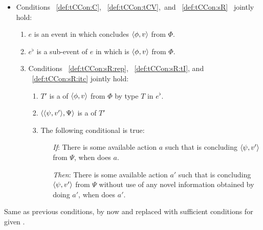 \begin{note}
\begin{definition}
    \begin{itemize}
    \item
      Conditions~%
      \ref{def:tCCon:C},~%
      \ref{def:tCCon:tCV},~and~%
      \ref{def:tCCon:sR}~%
      jointly hold:
      \begin{enumerate}[label=\arabic*., ref=(\arabic*)]
      \item
        \label{def:tCCon:C}
        \(e\) is an event in which \vAgent{} concludes \(\langle \phi, v \rangle\) from \(\Phi\).
      \item
        \label{def:tCCon:tCV}
        \(e^{\flat}\) is a sub-event of \(e\) in which \vAgent{} is \tCV{} \(\langle \phi, v \rangle\) from \(\Phi\).
      \item
        \label{def:tCCon:sR}
        Conditions%
        ~\ref{def:tCCon:sR:rep},%
        ~\ref{def:tCCon:sR:tI}, and%
        ~\ref{def:tCCon:sR:itc} %
        jointly hold:
        \begin{enumerate}[label=\alph*., ref=(\alph*)]
        \item
          \label{def:tCCon:sR:rep}
          \(T'\) is a \tRep{} of \vAgent{} \tCV{} \(\langle \phi, v \rangle\) from \(\Phi\) by type \(T\) in \(e^{\flat}\).
        \item
          \label{def:tCCon:sR:tI}
          \(\langle \langle \psi, v' \rangle, \Psi \rangle\) is a \tI{} of \(T'\)
        \item
          \label{def:tCCon:sR:itc}
          The following conditional is true:
          \begin{itemize}
          \item[\emph{If}:]
            There is some available action \(a\) such that \vAgent{} is concluding \(\langle \psi, v' \rangle\) from \(\Psi\), when \vAgent{} does \(a\).
          \item[\emph{Then}:]
            There is some available action \(a'\) such that \vAgent{} is concluding \(\langle \psi, v' \rangle\) from \(\Psi\) without use of any novel information obtained by doing \(a'\), when \vAgent{} does \(a'\).
          \end{itemize}
        \end{enumerate}
      \end{enumerate}
    \end{itemize}
    \vspace{-1.5\baselineskip}
  \end{definition}

  Same as previous conditions, by now \tCV{} and \requ{} replaced with sufficient conditions for \requ{} given \tCV{}.
\end{note}

